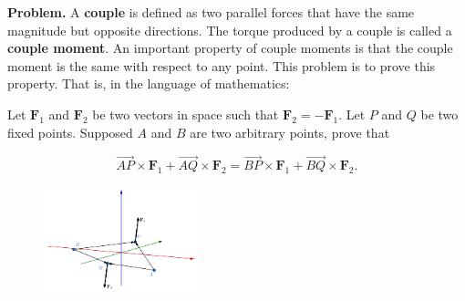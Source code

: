 \documentclass[10pt]{article}
\title{}
\date{}
\begin{document}
\noindent
{\bf Problem.}
A {\bf couple} is defined as two parallel {forces} that have the same magnitude but opposite directions. The {torque} produced by a couple is called a {\bf couple moment}. An important property of couple moments is that the couple moment is the same with respect to any point. This problem is to prove this property. That is, in the language of mathematics:

Let $\mathbf F_1$ and $\mathbf F_2$ be two vectors in space such that $\mathbf F_2 = -\mathbf F_1$. Let $P$ and $Q$ be two fixed points. Supposed $A$ and $B$ are two arbitrary points, prove that

\[
\overrightarrow{AP}\times\mathbf F_1+\overrightarrow{AQ}\times\mathbf F_2 = \overrightarrow{BP}\times\mathbf F_1+\overrightarrow{BQ}\times\mathbf F_2.
\]
\begin{figure}[h]
\includegraphics[width=0.4\textwidth, right]{couplemoment.png}
\end{figure}
\end{document}
